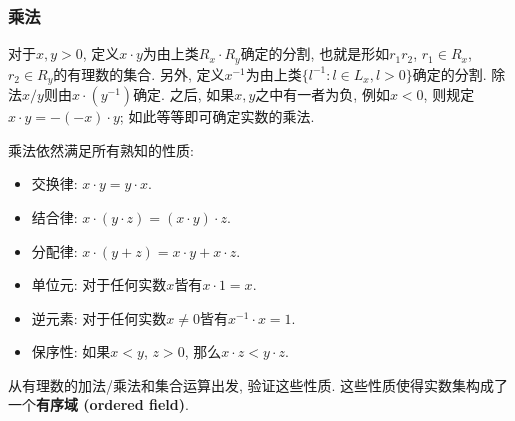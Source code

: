 \subsubsection{乘法}

对于$x,y>0$, 定义$x\cdot y$为由上类$R_x\cdot R_y$确定的分割, 也就是形如$r_1r_2$, $r_1\in R_x$, $r_2\in R_y$的有理数的集合. 另外, 定义$x^{-1}$为由上类$\{l^{-1}:l\in L_x,l>0\}$确定的分割. 除法$x/y$则由$x\cdot(y^{-1})$确定. 之后, 如果$x,y$之中有一者为负, 例如$x<0$, 则规定$x\cdot y=-(-x)\cdot y$; 如此等等即可确定实数的乘法. 

乘法依然满足所有熟知的性质:

\begin{itemize}
\item 交换律: $x\cdot y=y\cdot x$.
\item 结合律: $x\cdot (y\cdot z)=(x\cdot y)\cdot z$.
\item 分配律: $x\cdot (y+z)=x\cdot y+x\cdot z$.
\item 单位元: 对于任何实数$x$皆有$x\cdot 1=x$.
\item 逆元素: 对于任何实数$x\neq0$皆有$x^{-1}\cdot x=1$.
\item 保序性: 如果$x<y$, $z>0$, 那么$x\cdot z<y\cdot z$.
\end{itemize}

\begin{exercise}{}
从有理数的加法/乘法和集合运算出发, 验证这些性质. 这些性质使得实数集构成了一个\textbf{有序域 (ordered field)}.
\end{exercise}
